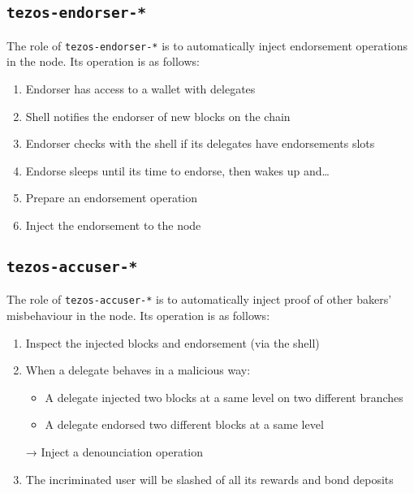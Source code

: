 \documentclass[a4paper,twocolumn,10pt]{article}
\begin{document}
\subsection{\texttt{tezos-endorser-*}}

The role of \texttt{tezos-endorser-*} is to automatically inject
endorsement operations in the node. Its operation is as follows:

\begin{footnotesize}
\begin{enumerate}
\item Endorser has access to a wallet with delegates
\item Shell notifies the endorser of new blocks on the chain
\item Endorser checks with the shell if its delegates have endorsements slots
\item Endorse sleeps until its time to endorse, then wakes up and…
\item Prepare an endorsement operation
\item Inject the endorsement to the node
\end{enumerate}
\end{footnotesize}

\subsection{\texttt{tezos-accuser-*}}

The role of \texttt{tezos-accuser-*} is to automatically inject proof
of other bakers' misbehaviour in the node. Its operation is as
follows:

\begin{footnotesize}
\begin{enumerate}
\item Inspect the injected blocks and endorsement (via the shell)
\item When a delegate behaves in a malicious way:
  \begin{itemize}
    \item A delegate injected two blocks at a same level on two different branches
    \item A delegate endorsed two different blocks at a same level
  \end{itemize}
  → Inject a denounciation operation
\item The incriminated user will be slashed of all its rewards and bond deposits
\end{enumerate}
\end{footnotesize}
\end{document}

